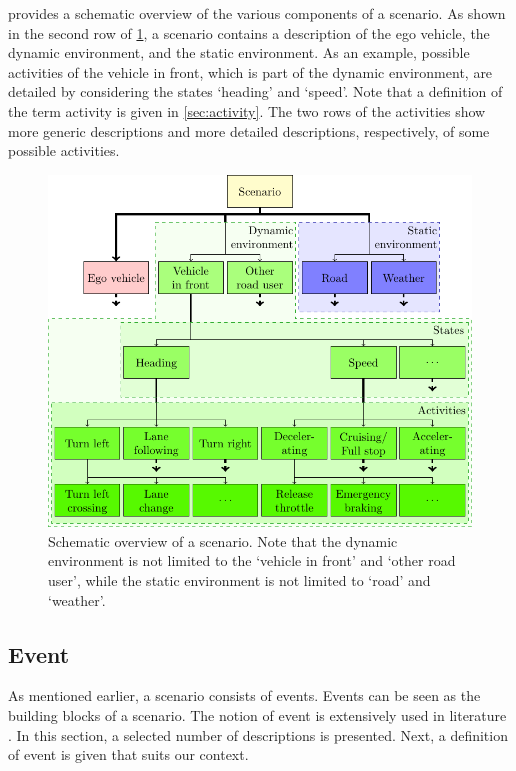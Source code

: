  provides a schematic overview of the various components of a scenario. As shown in the second row of \cref{fig:scenario}, a scenario contains a description of the ego vehicle, the dynamic environment, and the static environment. As an example, possible activities of the vehicle in front, which is part of the dynamic environment, are detailed by considering the states `heading' and `speed'. Note that a definition of the term activity is given in \cref{sec:activity}. The two rows of the activities show more generic descriptions and more detailed descriptions, respectively, of some possible activities.

\begin{figure}
	\centering
	\includegraphics[width=\linewidth]{figures/scenario.pdf}%
	\caption{Schematic overview of a scenario. Note that the dynamic environment is not limited to the `vehicle in front' and `other road user', while the static environment is not limited to `road' and `weather'.}
	\label{fig:scenario}
\end{figure}



\subsection{Event}
\label{sec:event}
As mentioned earlier, a scenario consists of events. Events can be seen as the building blocks of a scenario. The notion of event is extensively used in literature \cite{breu1997towards, kim1993supervenience, pfeiffer2013concepts, branicky1998hybridcontrol, deschutter2000optimal, heemels2012eventcontrol}. In this section, a selected number of descriptions is presented. Next, a definition of event is given that suits our context.

